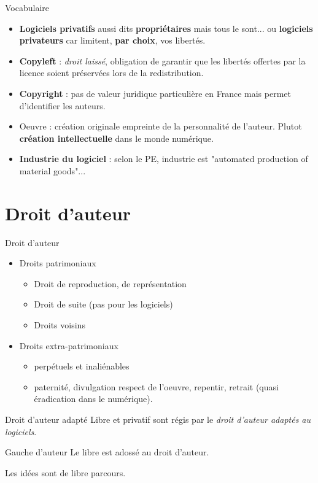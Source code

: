 \documentclass{beamer}
\begin{document}
\begin{frame}{Vocabulaire}

  \begin{itemize}
  \item \textbf{Logiciels privatifs} aussi dits \textbf{propriétaires} mais tous le sont... ou \textbf{logiciels privateurs} car limitent, \textbf{par choix}, vos libertés.
  \item \textbf{Copyleft} : \textit{droit laissé}, obligation de garantir que les libertés offertes par la licence soient préservées lors de la redistribution.
  \item \textbf{Copyright} : pas de valeur juridique particulière en France mais permet d'identifier les auteurs.
  \item Oeuvre : création originale empreinte de la personnalité de l'auteur. Plutot \textbf{création intellectuelle} dans le monde numérique.
  \item \textbf{Industrie du logiciel} : selon le PE, industrie est "automated production of material goods"...
  \end{itemize}
\end{frame}

\section{Droit d'auteur}

\begin{frame}{Droit d'auteur}

  \begin{itemize}
  \item Droits patrimoniaux
    \begin{itemize}
    \item Droit de reproduction, de représentation
    \item Droit de suite (pas pour les logiciels)
    \item Droits voisins
    \end{itemize}
  \item Droits extra-patrimoniaux
    \begin{itemize}
    \item perpétuels et inaliénables
    \item paternité, divulgation  respect de l'oeuvre, repentir, retrait (quasi éradication dans le numérique).
    \end{itemize}
  \end{itemize}

 \begin{alertblock}{Droit d'auteur adapté}
    Libre et privatif sont régis par le \textit{droit d'auteur adaptés au logiciels}.
  \end{alertblock}

  \begin{alertblock}{Gauche d'auteur}
    Le libre est adossé au droit d'auteur.
  \end{alertblock}
  
  Les idées sont de libre parcours.
\end{frame}
\end{document}
